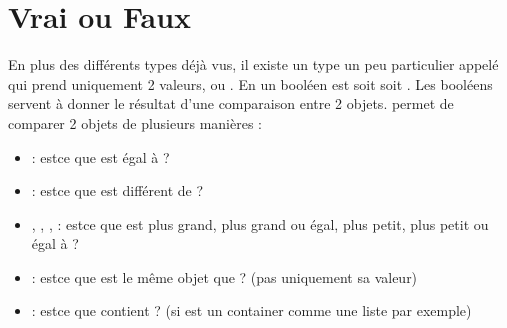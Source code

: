 \documentclass[letterpaper,10pt,english]{sphinxmanual}
\begin{document}
\section{Vrai ou Faux}
\label{\detokenize{src/OCI03_Booleans_IfBlock:vrai-ou-faux}}
En plus des différents types déjà vus, il existe un type un peu particulier appelé  qui prend uniquement 2 valeurs,  ou .
En  un booléen est soit  soit .
Les booléens servent à donner le résultat d’une comparaison entre 2 objets.
 permet de comparer 2 objets de plusieurs manières :
\begin{itemize}
\item {} 
: est\sphinxhyphen{}ce que  est égal à ?

\item {} 
: est\sphinxhyphen{}ce que  est différent de ?

\item {} 
, , , : est\sphinxhyphen{}ce que  est plus grand, plus grand ou égal, plus petit, plus petit ou égal à ?

\item {} 
: est\sphinxhyphen{}ce que  est le même objet que  ? (pas uniquement sa valeur)

\item {} 
: est\sphinxhyphen{}ce que  contient  ? (si  est un container comme une liste par exemple)

\end{itemize}

\begin{sphinxVerbatim}[commandchars=\\\{\}]
  
\end{sphinxVerbatim}
\end{document}
